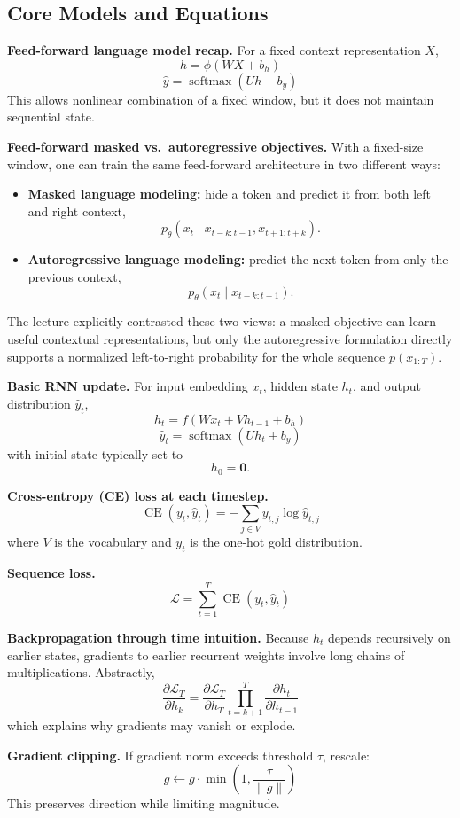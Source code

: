 \documentclass[11pt]{article}
\begin{document}
\subsection{Core Models and Equations}
\textbf{Feed-forward language model recap.} For a fixed context representation \(X\),
\[
h = \phi(WX + b_h)
\]
\[
\hat{y} = \operatorname{softmax}(Uh + b_y)
\]
This allows nonlinear combination of a fixed window, but it does not maintain sequential state.

\textbf{Feed-forward masked vs.\ autoregressive objectives.} With a fixed-size window, one can train the same feed-forward architecture in two different ways:
\begin{itemize}
    \item \textbf{Masked language modeling:} hide a token and predict it from both left and right context,
    \[
    p_\theta(x_t \mid x_{t-k:t-1}, x_{t+1:t+k}).
    \]
    \item \textbf{Autoregressive language modeling:} predict the next token from only the previous context,
    \[
    p_\theta(x_t \mid x_{t-k:t-1}).
    \]
\end{itemize}
The lecture explicitly contrasted these two views: a masked objective can learn useful contextual representations, but only the autoregressive formulation directly supports a normalized left-to-right probability for the whole sequence \(p(x_{1:T})\).

\textbf{Basic RNN update.} For input embedding \(x_t\), hidden state \(h_t\), and output distribution \(\hat{y}_t\),
\[
h_t = f(Wx_t + Vh_{t-1} + b_h)
\]
\[
\hat{y}_t = \operatorname{softmax}(Uh_t + b_y)
\]
with initial state typically set to
\[
h_0 = \mathbf{0}.
\]

\textbf{Cross-entropy (CE) loss at each timestep.}
\[
\operatorname{CE}(y_t,\hat{y}_t) = - \sum_{j \in V} y_{t,j}\log \hat{y}_{t,j}
\]
where \(V\) is the vocabulary and \(y_t\) is the one-hot gold distribution.

\textbf{Sequence loss.}
\[
\mathcal{L} = \sum_{t=1}^{T} \operatorname{CE}(y_t,\hat{y}_t)
\]

\textbf{Backpropagation through time intuition.} Because \(h_t\) depends recursively on earlier states, gradients to earlier recurrent weights involve long chains of multiplications. Abstractly,
\[
\frac{\partial \mathcal{L}_T}{\partial h_k}
= \frac{\partial \mathcal{L}_T}{\partial h_T}
\prod_{t=k+1}^{T}
\frac{\partial h_t}{\partial h_{t-1}}
\]
which explains why gradients may vanish or explode.

\textbf{Gradient clipping.} If gradient norm exceeds threshold \(\tau\), rescale:
\[
g \leftarrow g \cdot \min\left(1, \frac{\tau}{\lVert g \rVert}\right)
\]
This preserves direction while limiting magnitude.
\end{document}
